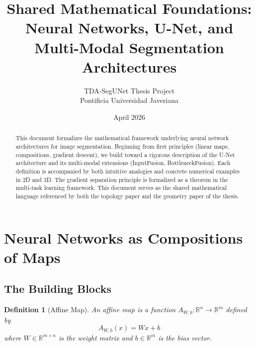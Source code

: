 \documentclass[10pt,twocolumn]{article}
\title{\textbf{Shared Mathematical Foundations:}\\Neural Networks, U-Net, and Multi-Modal Segmentation Architectures}
\author{TDA-SegUNet Thesis Project\\Pontificia Universidad Javeriana}
\date{April 2026}
\newtheorem{definition}{Definition}[section]
\begin{document}
\maketitle

\begin{abstract}
This document formalizes the mathematical framework underlying neural network architectures for image segmentation. Beginning from first principles (linear maps, compositions, gradient descent), we build toward a rigorous description of the U-Net architecture and its multi-modal extensions (InputFusion, BottleneckFusion). Each definition is accompanied by both intuitive analogies and concrete numerical examples in 2D and 3D. The gradient separation principle is formalized as a theorem in the multi-task learning framework. This document serves as the shared mathematical language referenced by both the topology paper and the geometry paper of the thesis.
\end{abstract}

\section{Neural Networks as Compositions of Maps}

\subsection{The Building Blocks}

\begin{definition}[Affine Map]
An affine map is a function $A_{W,b}: \mathbb{R}^n \to \mathbb{R}^m$ defined by
\begin{equation}
A_{W,b}(x) = Wx + b
\end{equation}
where $W \in \mathbb{R}^{m \times n}$ is the weight matrix and $b \in \mathbb{R}^m$ is the bias vector.
\end{definition}
\end{document}
